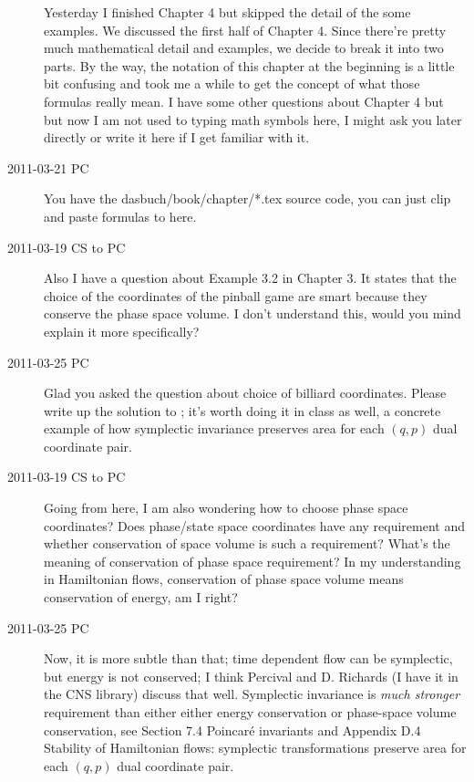 \begin{description}
   Yesterday I finished Chapter 4 but skipped the detail of the some
   examples. We discussed the first half of Chapter 4. Since there're
   pretty much mathematical detail and examples, we decide to break it
   into two parts. By the way, the notation of this chapter at the
   beginning is a little bit confusing and took me a while to get the
   concept of what those formulas really mean. I have some other
   questions about Chapter 4 but but now I am not used to typing math
   symbols here, I might ask you later directly or write it here if I get
   familiar with it.

\item[2011-03-21 PC] You have the dasbuch/book/chapter/*.tex source
code, you can just clip and paste formulas to here.

\item[2011-03-19 CS to PC]
Also I have a question about Example 3.2 in Chapter 3. It states that
   the choice of the coordinates of the pinball game are smart because
   they conserve the phase space volume. I don't understand this, would
   you mind explain it more specifically?

\item[2011-03-25 PC]
Glad you asked the question about choice of billiard coordinates. Please write up the solution to ; it's worth doing it in class as well, a concrete example of how symplectic invariance preserves area for each $(q,p)$ dual coordinate  pair.

\item[2011-03-19 CS to PC]
Going from here, I am also
   wondering how to choose phase space coordinates? Does phase/state
   space coordinates have any requirement and whether conservation of
   space volume is such a requirement? What's the meaning of conservation
   of phase space requirement? In my understanding in Hamiltonian flows,
   conservation of phase space volume means conservation of energy, am I
   right?


\item[2011-03-25 PC]
Now, it is more subtle than that; time dependent flow can be symplectic, but energy is not conserved; I think Percival and D. Richards (I have it in the
 {CNS library}) discuss that well. Symplectic invariance is \emph{much stronger} requirement than either either energy conservation or phase-space volume conservation, see
 {Section 7.4 Poincar\'e invariants} and 
{Appendix D.4 Stability of Hamiltonian flows}:
symplectic transformations preserve area for each $(q,p)$ dual coordinate  pair.


\end{description}
